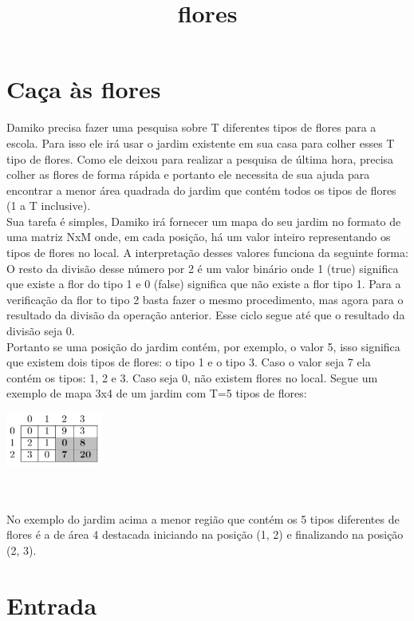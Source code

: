 \documentclass{article}
\title{flores}
\begin{document}
\section{Caça às flores}

Damiko precisa fazer uma pesquisa sobre T diferentes tipos de flores para a escola. Para isso ele irá usar o jardim existente em sua casa para colher esses T tipo de flores. Como ele deixou para realizar a pesquisa de última hora, precisa colher as flores de forma rápida e portanto ele necessita de sua ajuda para encontrar a menor área quadrada do jardim que contém todos os tipos de flores (1 a T inclusive).
\\
Sua tarefa é simples, Damiko irá fornecer um mapa do seu jardim no formato de uma matriz NxM onde, em cada posição, há um valor inteiro representando os tipos de flores no local. A interpretação desses valores funciona da seguinte forma: O resto da divisão desse número por 2 é um valor binário onde 1 (true) significa que existe a flor do tipo 1 e 0 (false) significa que não existe a flor tipo 1. Para a verificação da flor to tipo 2 basta fazer o mesmo procedimento, mas agora para o resultado da divisão da operação anterior. Esse ciclo segue até que o resultado da divisão seja 0.
\\
Portanto se uma posição do jardim contém, por exemplo, o valor 5, isso significa que existem dois tipos de flores: o tipo 1 e o tipo 3. Caso o valor seja 7 ela contém os tipos:  1, 2 e 3. Caso seja 0, não existem flores no local.
Segue um exemplo de mapa 3x4 de um jardim com T=5 tipos de flores:
\\
\begin{center}
\includegraphics[width=120]{floresTabela.PNG}
\end{center}
\\ \\
No exemplo do jardim acima a menor região que contém os 5 tipos diferentes de flores é a de área 4 destacada iniciando na posição (1, 2) e finalizando na posição (2, 3).

\section*{Entrada}
\end{document}
